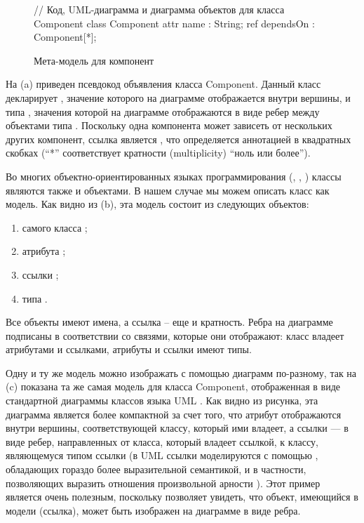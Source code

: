 \begin{figure}[htbp]
// Код, UML-диаграмма и диаграмма объектов для класса Component
class Component {
	attr name : String;
	ref dependsOn : Component[*];
}
\caption{Мета-модель для компонент}\label{ComponentClass}
\end{figure}

На  (a) приведен псевдокод объявления класса Component. Данный класс декларирует    , значение которого на диаграмме отображается внутри вершины, и   типа , значения которой на диаграмме отображаются в виде ребер между объектами типа . Поскольку одна компонента может зависеть от нескольких других компонент, ссылка  является , что определяется аннотацией в квадратных скобках (``*'' соответствует кратности (multiplicity) ``ноль или более'').

Во многих объектно-ориентированных языках программирования (, ,  \cite{???}) классы являются также и объектами. В нашем случае мы можем описать класс  как модель. Как видно из  (b), эта модель состоит из следующих объектов: 
\begin{enumerate}
\item самого класса ;
\item атрибута ;
\item ссылки ;
\item типа .
\end{enumerate}
Все объекты имеют имена, а ссылка  -- еще и кратность.
Ребра на диаграмме подписаны в соответствии со связями, которые они отображают: класс владеет атрибутами и ссылками, атрибуты и ссылки имеют типы. 

Одну и ту же модель можно изображать с помощью диаграмм по-разному, так на  (c) показана та же самая модель для класса Component, отображенная в виде стандартной диаграммы классов языка UML \cite{???}. Как видно из рисунка, эта диаграмма является более компактной за счет того, что атрибут отображаются внутри вершины, соответствующей классу, который ими владеет, а ссылки --- в виде ребер, направленных от класса, который владеет ссылкой, к классу, являющемуся типом ссылки (в UML ссылки моделируются с помощью , обладающих гораздо более выразительной семантикой, и в частности, позволяющих выразить отношения произвольной арности \cite{???}). Этот пример является очень полезным, поскольку позволяет увидеть, что объект, имеющийся в модели (ссылка), может быть изображен на диаграмме в виде ребра.

